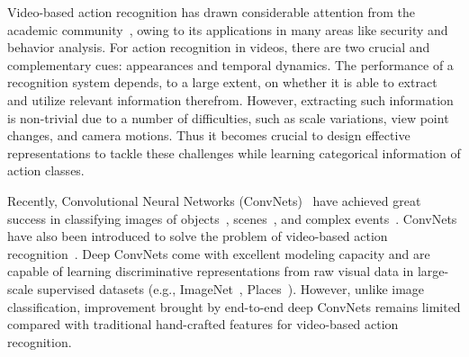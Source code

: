 \documentclass[10pt,journal,compsoc]{IEEEtran}
\begin{document}
\IEEEdisplaynontitleabstractindextext



%
\IEEEpeerreviewmaketitle



Video-based action recognition has drawn considerable attention from the academic community~\cite{SimonyanZ14,WangS13a,WangQT13a,Ng15,WangQT15a}, owing to its applications in many areas like security and behavior analysis. For action recognition in videos, there are two crucial and complementary cues: appearances and temporal dynamics. The performance of a recognition system depends, to a large extent, on whether it is able to extract and utilize relevant information therefrom.
However, extracting such information is non-trivial due to a number of difficulties, such as scale variations, view point changes, and camera motions.
Thus it becomes crucial to design effective representations to tackle these challenges while learning categorical information of action classes.

Recently, Convolutional Neural Networks (ConvNets)~\cite{lecun-98} have achieved great success in classifying images of objects~\cite{KrizhevskySH12,SimonyanZ14a,SzegedyLJSRAEVR14}, scenes~\cite{ZhouLXTO14,ShenLH16,WangGHX016}, and complex events~\cite{XiongY2015,WangW0G16}.
ConvNets have also been introduced to solve the problem of video-based action recognition~\cite{KarpathyTSLSF14,SimonyanZ14,TranBFTP15,ZhangWWQW16}.
Deep ConvNets come with excellent modeling capacity and are capable of learning discriminative representations from raw visual data in large-scale supervised datasets (e.g., ImageNet~\cite{DengDSLL009}, Places~\cite{ZhouLXTO14}). However, unlike image classification, improvement brought by end-to-end deep ConvNets remains limited compared with traditional hand-crafted features for video-based action recognition. 
\end{document}
